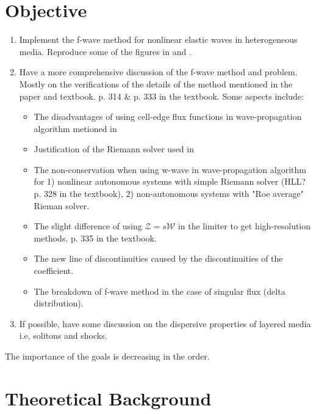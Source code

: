 \documentclass{article}
\begin{document}
\section{Objective}
\begin{enumerate}
\item Implement the f-wave method for nonlinear elastic waves in heterogeneous media. Reproduce some of the figures in \cite{bale2002} \cite{leveque2003} and \cite{ketcheson2012}.
\item Have a more comprehensive discussion of the f-wave method and problem. Mostly on the verifications of the details of the method mentioned in the paper and textbook. p. 314 $\&$ p. 333 in the textbook. Some aspects include:
    \begin{itemize}
    \item The disadvantages of using cell-edge flux functions in wave-propagation algorithm metioned in \cite[p. 957]{bale2002}
    \item Justification of the Riemann solver used in \cite[p. 967]{bale2002}
    \item The non-conservation when using w-wave in wave-propagation algorithm for 1) nonlinear autonomous systems with simple Riemann solver (HLL? p. 328 in the textbook), 2) non-autonomous systems with "Roe average" Rieman solver.
    \item The slight difference of using $\mathcal{Z}=s\mathcal{W}$ in the limiter to get high-resolution methods. \cite[p. 964]{bale2002} p. 335 in the textbook.
    \item The new line of discontinuities caused by the discontinuities of the coefficient. \cite[p. 960]{bale2002}
    \item The breakdown of f-wave method in the case of singular flux (delta distribution).  \cite[p. 961]{bale2002}
    \end{itemize}
\item If possible, have some discussion on the dispersive properties of layered media i.e, solitons and shocks.
\end{enumerate}
The importance of the goals is decreasing in the order.
\section{Theoretical Background}
\end{document}
